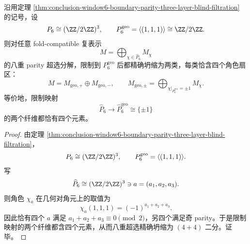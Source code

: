 \begin{corollary}\label{cor:conclusion-window6-geometric-uplift-four-four-collapse}
沿用定理 \ref{thm:conclusion-window6-boundary-parity-three-layer-blind-filtration} 的记号，设
\[
P_6\cong (\ZZ/2\ZZ)^3,
\qquad
P_6^{\mathrm{geo}}=\langle(1,1,1)\rangle\cong \ZZ/2\ZZ.
\]
则对任意 fold-compatible 复表示
\[
M=\bigoplus_{\chi\in \widehat P_6} M_\chi
\]
的八重 parity 超选分解，限制到 \(P_6^{\mathrm{geo}}\) 后都精确坍缩为两类，每类恰含四个角色扇区：
\[
M=M_{\mathrm{geo},+}\oplus M_{\mathrm{geo},-},
\qquad
M_{\mathrm{geo},\pm}
=
\bigoplus_{\chi|_{P_6^{\mathrm{geo}}}=\pm 1} M_\chi.
\]
等价地，限制映射
\[
\widehat P_6\longrightarrow \widehat P_6^{\mathrm{geo}} \cong \{\pm 1\}
\]
的两个纤维都恰有四个元素。
\end{corollary}
\begin{proof}
由定理 \ref{thm:conclusion-window6-boundary-parity-three-layer-blind-filtration}，
\[
P_6\cong (\ZZ/2\ZZ)^3,
\qquad
P_6^{\mathrm{geo}}=\langle(1,1,1)\rangle.
\]
写
\[
\widehat P_6\cong (\ZZ/2\ZZ)^3\ni a=(a_1,a_2,a_3).
\]
则角色 \(\chi_a\) 在几何对角元上的取值为
\[
\chi_a(1,1,1)=(-1)^{a_1+a_2+a_3}.
\]
因此恰有四个 \(a\) 满足 \(a_1+a_2+a_3\equiv 0\pmod 2\)，另四个满足奇 parity。于是限制映射的两个纤维都含四个元素，从而八重超选精确坍缩为 \((4+4)\) 二分。证毕。
\end{proof}

